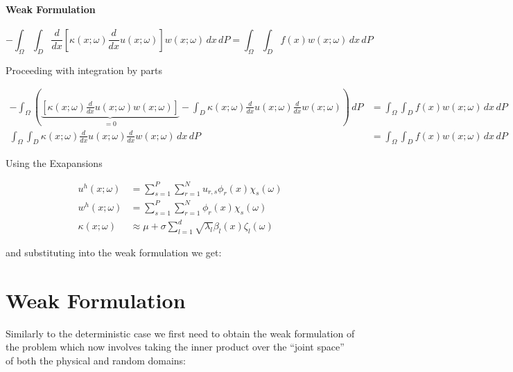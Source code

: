 \paragraph{Weak Formulation}

\begin{equation}
	-\int_{\Omega}\int_D \frac{d}{dx}\left[\kappa(x;\omega)\frac{d}{dx}u(x;\omega)\right]
           w(x;\omega)\, dx\, dP = \int_{\Omega}\int_D f(x)w(x;\omega)\, dx\, dP
\end{equation}

Proceeding with integration by parts

\begin{align}
	-\int_{\Omega}\left(
      \underbrace{\left[\kappa(x;\omega)\frac{d}{dx}u(x;\omega)w(x;\omega)\right]}_{= 0}
      - \int_D\kappa(x;\omega)\frac{d}{dx}u(x;\omega)\frac{d}{dx}w(x;\omega)
     \right)\, dP &= \int_{\Omega}\int_D f(x)w(x;\omega)\, dx\, dP \\
     \int_{\Omega}\int_D\kappa(x;\omega)
           \frac{d}{dx}u(x;\omega)\frac{d}{dx}w(x;\omega)\, dx\, dP &=
     \int_{\Omega}\int_D f(x)w(x;\omega)\, dx\, dP
\end{align}

Using the Exapansions

\begin{align}
	u^h(x;\omega) &= \sum_{s=1}^P\sum_{r=1}^Nu_{r,s}\phi_r(x)\chi_s(\omega) \\
    w^h(x;\omega) &= \sum_{s=1}^P\sum_{r=1}^N\phi_r(x)\chi_s(\omega) \\
    \kappa(x;\omega) &\approx \mu + \sigma\sum_{l=1}^d\sqrt{\lambda_l}\beta_l(x)\zeta_l(\omega)
\end{align}

and substituting into the weak formulation we get:

\section{Weak Formulation}


Similarly to the deterministic case we first need to obtain the weak formulation
of the problem which now involves taking the inner product over the ``joint space''
of both the physical and random domains:
